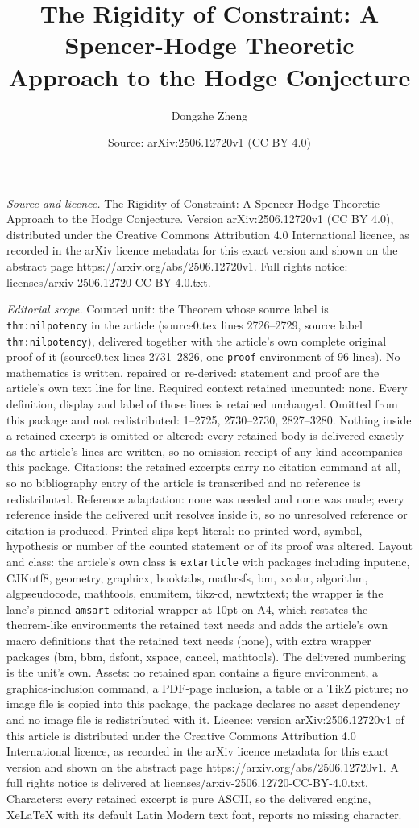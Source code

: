 \documentclass[10pt,a4paper]{amsart}
\title[The Rigidity of Constraint: A Spencer-Hodge Theoretic Approa]{The Rigidity of Constraint: A Spencer-Hodge Theoretic Approach to the Hodge Conjecture}
\author{Dongzhe Zheng}
\date{Source: arXiv:2506.12720v1 (CC BY 4.0)}
\begin{document}
\maketitle

\noindent\emph{Source and licence.} The Rigidity of Constraint: A Spencer-Hodge Theoretic Approach to the Hodge Conjecture. Version arXiv:2506.12720v1 (CC BY 4.0), distributed under the Creative Commons Attribution 4.0 International licence, as recorded in the arXiv licence metadata for this exact version and shown on the abstract page https://arxiv.org/abs/2506.12720v1. Full rights notice: licenses/arxiv-2506.12720-CC-BY-4.0.txt.\par\smallskip

\noindent\textit{Editorial scope.} Counted unit: the Theorem whose source label is \texttt{thm:nilpotency} in the article (source0.tex lines 2726--2729, source label \texttt{thm:nilpotency}), delivered together with the article's own complete original proof of it (source0.tex lines 2731--2826, one \texttt{proof} environment of 96 lines). No mathematics is written, repaired or re-derived: statement and proof are the article's own text line for line. Required context retained uncounted: none. Every definition, display and label of those lines is retained unchanged. Omitted from this package and not redistributed: 1--2725, 2730--2730, 2827--3280. Nothing inside a retained excerpt is omitted or altered: every retained body is delivered exactly as the article's lines are written, so no omission receipt of any kind accompanies this package. Citations: the retained excerpts carry no citation command at all, so no bibliography entry of the article is transcribed and no reference is redistributed. Reference adaptation: none was needed and none was made; every reference inside the delivered unit resolves inside it, so no unresolved reference or citation is produced. Printed slips kept literal: no printed word, symbol, hypothesis or number of the counted statement or of its proof was altered. Layout and class: the article's own class is \texttt{extarticle} with packages including inputenc, CJKutf8, geometry, graphicx, booktabs, mathrsfs, bm, xcolor, algorithm, algpseudocode, mathtools, enumitem, tikz-cd, newtxtext; the wrapper is the lane's pinned \texttt{amsart} editorial wrapper at 10pt on A4, which restates the theorem-like environments the retained text needs and adds the article's own macro definitions that the retained text needs (none), with extra wrapper packages (bm, bbm, dsfont, xspace, cancel, mathtools). The delivered numbering is the unit's own. Assets: no retained span contains a figure environment, a graphics-inclusion command, a PDF-page inclusion, a table or a TikZ picture; no image file is copied into this package, the package declares no asset dependency and no image file is redistributed with it. Licence: version arXiv:2506.12720v1 of this article is distributed under the Creative Commons Attribution 4.0 International licence, as recorded in the arXiv licence metadata for this exact version and shown on the abstract page https://arxiv.org/abs/2506.12720v1. A full rights notice is delivered at licenses/arxiv-2506.12720-CC-BY-4.0.txt. Characters: every retained excerpt is pure ASCII, so the delivered engine, XeLaTeX with its default Latin Modern text font, reports no missing character.
\end{document}
